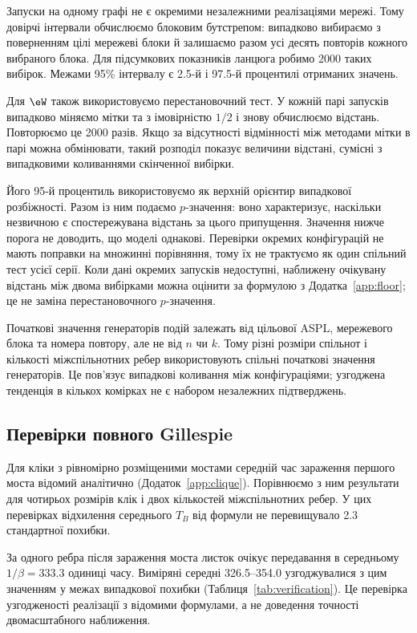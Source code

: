 Запуски на одному графі не є окремими незалежними реалізаціями мережі. Тому довірчі інтервали обчислюємо блоковим бутстрепом: випадково вибираємо з поверненням цілі мережеві блоки й залишаємо разом усі десять повторів кожного вибраного блока. Для підсумкових показників ланцюга робимо 2000 таких вибірок. Межами 95\% інтервалу є 2.5-й і 97.5-й процентилі отриманих значень.
\par Для $\eW$ також використовуємо перестановочний тест. У кожній парі запусків випадково міняємо мітки \Full{} та \TS{} з імовірністю $1/2$ і знову обчислюємо відстань. Повторюємо це 2000 разів. Якщо за відсутності відмінності між методами мітки в парі можна обмінювати, такий розподіл показує величини відстані, сумісні з випадковими коливаннями скінченної вибірки.
\par Його 95-й процентиль використовуємо як верхній орієнтир випадкової розбіжності. Разом із ним подаємо $p$-значення: воно характеризує, наскільки незвичною є спостережувана відстань за цього припущення. Значення нижче порога не доводить, що моделі однакові. Перевірки окремих конфігурацій не мають поправки на множинні порівняння, тому їх не трактуємо як один спільний тест усієї серії. Коли дані окремих запусків недоступні, наближену очікувану відстань між двома вибірками можна оцінити за формулою з Додатка~\ref{app:floor}; це не заміна перестановочного $p$-значення.

Початкові значення генераторів подій залежать від цільової ASPL, мережевого блока та номера повтору, але не від $n$ чи $k$. Тому різні розміри спільнот і кількості міжспільнотних ребер використовують спільні початкові значення генераторів. Це пов'язує випадкові коливання між конфігураціями; узгоджена тенденція в кількох комірках не є набором незалежних підтверджень.

\subsection{Перевірки повного Gillespie}

Для кліки з рівномірно розміщеними мостами середній час зараження першого моста відомий аналітично (Додаток~\ref{app:clique}). Порівнюємо з ним результати \Full{} для чотирьох розмірів клік і двох кількостей міжспільнотних ребер. У цих перевірках відхилення середнього $T_B$ від формули не перевищувало 2.3 стандартної похибки.
\par За одного ребра після зараження моста листок очікує передавання в середньому $1/\beta=333.3$ одиниці часу. Виміряні середні 326.5--354.0 узгоджувалися з цим значенням у межах випадкової похибки (Таблиця~\ref{tab:verification}). Це перевірка узгодженості реалізації \Full{} з відомими формулами, а не доведення точності двомасштабного наближення.
